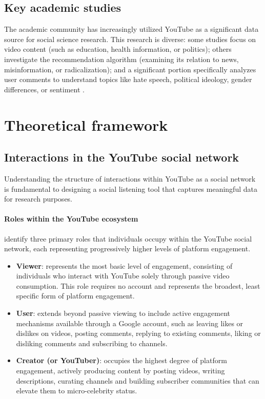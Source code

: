 \subsection{Key academic studies}

The academic community has increasingly utilized YouTube as a significant data source for social science research. This research is diverse: some studies focus on video content (such as education, health information, or politics); others investigate the recommendation algorithm (examining its relation to news, misinformation, or radicalization); and a significant portion specifically analyzes user comments to understand topics like hate speech, political ideology, gender differences, or sentiment \autocite{deubel2024overview}.

\section{Theoretical framework}

\subsection{Interactions in the YouTube social network}

Understanding the structure of interactions within YouTube as a social network is fundamental to designing a social listening tool that captures meaningful data for research purposes.

\paragraph{Roles within the YouTube ecosystem}

\textcite{sui2022youtube} identify three primary roles that individuals occupy within the YouTube social network, each representing progressively higher levels of platform engagement.

\begin{itemize}
    \item \textbf{Viewer}: represents the most basic level of engagement, consisting of individuals who interact with YouTube solely through passive video consumption. This role requires no account and represents the broadest, least specific form of platform engagement.

    \item \textbf{User}: extends beyond passive viewing to include active engagement mechanisms available through a Google account, such as leaving likes or dislikes on videos, posting comments, replying to existing comments, liking or disliking comments and subscribing to channels.

    \item \textbf{Creator (or YouTuber)}: occupies the highest degree of platform engagement, actively producing content by posting videos, writing descriptions, curating channels and building subscriber communities that can elevate them to micro-celebrity status.
\end{itemize}

